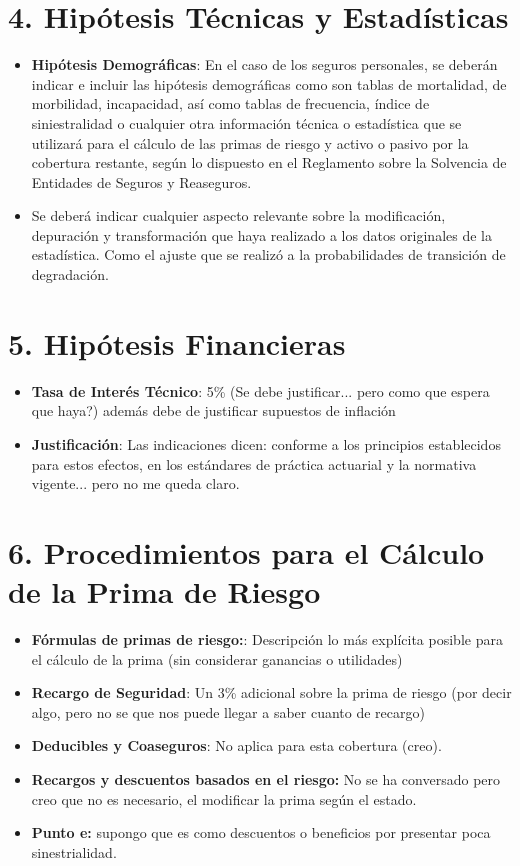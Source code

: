 \documentclass{article}
\begin{document}
	\section*{4. Hipótesis Técnicas y Estadísticas}
	\begin{itemize}
		\item \textbf{Hipótesis Demográficas}: En el caso de los seguros personales, se deberán indicar e incluir las hipótesis demográficas como son tablas de mortalidad, de morbilidad, incapacidad, así como tablas de frecuencia, índice de siniestralidad o cualquier otra información técnica o estadística que se utilizará para el cálculo de las primas de riesgo y activo o pasivo por la cobertura restante, según lo dispuesto en el Reglamento sobre la Solvencia de Entidades de Seguros y Reaseguros.
		
	\item	Se deberá indicar cualquier aspecto relevante sobre la modificación, depuración y transformación que haya realizado a los datos originales de la estadística. Como el ajuste que se realizó a la probabilidades de transición de degradación.
	\end{itemize}
	
	\section*{5. Hipótesis Financieras}
	\begin{itemize}
		\item \textbf{Tasa de Interés Técnico}: 5\% (Se debe justificar... pero como que espera que haya?) además debe de justificar supuestos de inflación
		\item \textbf{Justificación}: Las indicaciones dicen: conforme a los principios establecidos para estos efectos, en los estándares de práctica actuarial y la normativa vigente... pero no me queda claro.
	\end{itemize}
	
	\section*{6. Procedimientos para el Cálculo de la Prima de Riesgo}
	\begin{itemize}
		\item \textbf{Fórmulas de primas de riesgo:}: Descripción lo más explícita posible para el cálculo de la prima (sin considerar ganancias o utilidades)
		\item \textbf{Recargo de Seguridad}: Un 3\% adicional sobre la prima de riesgo (por decir algo, pero no se que nos puede llegar a saber cuanto de recargo)
		\item \textbf{Deducibles y Coaseguros}: No aplica para esta cobertura (creo).
		\item \textbf{Recargos y descuentos basados en el riesgo:} No se ha conversado pero creo que no es necesario, el modificar la prima según el estado.
		\item \textbf{Punto e:} supongo que es como descuentos o beneficios por presentar poca sinestrialidad. 
	\end{itemize}
	
\end{document}
